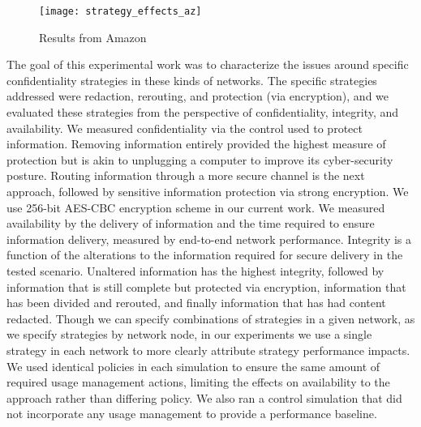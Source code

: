 \begin{figure}[!t]
\centering
\texttt{[image: strategy\_effects\_az]}
\caption{Results from Amazon}
\label{fig:model:amazon-results}
\end{figure}

The goal of this experimental work was to characterize the issues around specific confidentiality strategies in these kinds of networks.  The specific strategies addressed were redaction, rerouting, and protection (via encryption), and we evaluated these strategies from the perspective of confidentiality, integrity, and availability. We measured confidentiality via the control used to protect information.  Removing information entirely provided the highest measure of protection but is akin to unplugging a computer to improve its cyber-security posture.   Routing information through a more secure channel is the next approach, followed by sensitive information protection via strong encryption.  We use 256-bit AES-CBC encryption scheme in our current work.  We measured availability by the delivery of information and the time required to ensure information delivery, measured by end-to-end network performance.  Integrity is a function of the alterations to the information required for secure delivery in the tested scenario.  Unaltered information has the highest integrity, followed by information that is still complete but protected via encryption, information that has been divided and rerouted, and finally information that has had content redacted.  Though we can specify combinations of strategies in a given network, as we specify strategies by network node, in our experiments we use a single strategy in each network to more clearly attribute strategy performance impacts. We used identical policies in each simulation to ensure the same amount of required usage management actions, limiting the effects on availability to the approach rather than differing policy.  We also ran a control simulation that did not incorporate any usage management to provide a performance baseline.  

